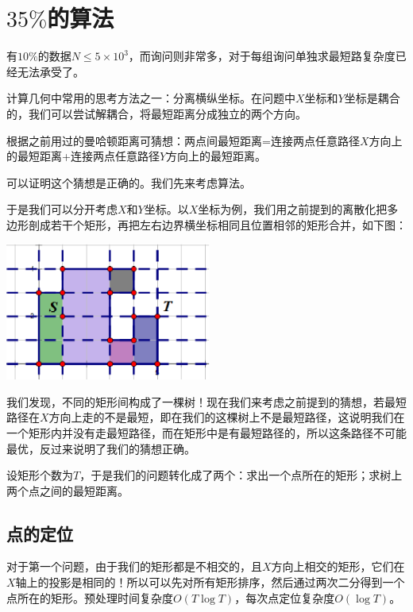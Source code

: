 \documentclass[a4paper]{article}
\begin{document}
\section{$35\%$的算法}
有$10\%$的数据$N \le 5 \times 10^3$，而询问则非常多，对于每组询问单独求最短路复杂度已经无法承受了。 \par
计算几何中常用的思考方法之一：分离横纵坐标。在问题中$X$坐标和$Y$坐标是耦合的，我们可以尝试解耦合，将最短距离分成独立的两个方向。 \par
根据之前用过的曼哈顿距离可猜想：两点间最短距离=连接两点任意路径$X$方向上的最短距离+连接两点任意路径$Y$方向上的最短距离。 \par
可以证明这个猜想是正确的。我们先来考虑算法。 \par
于是我们可以分开考虑$X$和$Y$坐标。以$X$坐标为例，我们用之前提到的离散化把多边形剖成若干个矩形，再把左右边界横坐标相同且位置相邻的矩形合并，如下图：
\begin{center}
\includegraphics[height=128pt]{maze_1.eps}
\end{center}
\par
我们发现，不同的矩形间构成了一棵树！现在我们来考虑之前提到的猜想，若最短路径在$X$方向上走的不是最短，即在我们的这棵树上不是最短路径，这说明我们在一个矩形内并没有走最短路径，而在矩形中是有最短路径的，所以这条路径不可能最优，反过来说明了我们的猜想正确。 \par
设矩形个数为$T$，于是我们的问题转化成了两个：求出一个点所在的矩形；求树上两个点之间的最短距离。 \par
\subsection{点的定位}
对于第一个问题，由于我们的矩形都是不相交的，且$X$方向上相交的矩形，它们在$X$轴上的投影是相同的！所以可以先对所有矩形排序，然后通过两次二分得到一个点所在的矩形。预处理时间复杂度$O(T\log{T})$，每次点定位复杂度$O(\log{T})$。 \par
\end{document}
